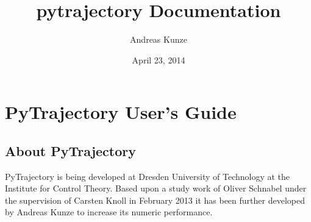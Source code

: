 \documentclass[letterpaper,10pt,english]{sphinxmanual}
\title{pytrajectory Documentation}
\date{April 23, 2014}
\author{Andreas Kunze}
\begin{document}
\maketitle
\tableofcontents
{}\label{index::doc}



\chapter{PyTrajectory User's Guide}
\label{guide/index:pytrajectory-user-s-guide}\label{guide/index:welcome-to-pytrajectory-s-documentation}\label{guide/index::doc}

\section{About PyTrajectory}
\label{guide/about:about-pytrajectory}\label{guide/about::doc}
PyTrajectory is being developed at Dresden University of Technology at the Institute for Control Theory.
Based upon a study work of Oliver Schnabel under the supervision of Carsten Knoll in February 2013
it has been further developed by Andreas Kunze to increase its numeric performance.
\end{document}
